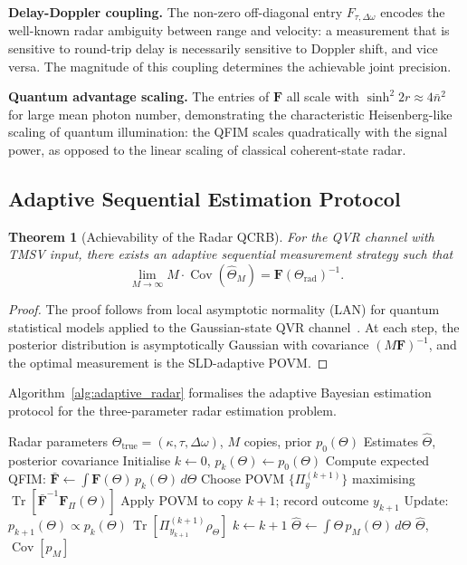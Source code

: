 \documentclass[journal]{IEEEtran}
\newtheorem{theorem}{Theorem}
\DeclareMathOperator{\Tr}{Tr}
\DeclareMathOperator{\Cov}{Cov}
\begin{document}
\textbf{Delay-Doppler coupling.} The non-zero off-diagonal entry $F_{\tau,\Delta\omega}$ encodes the well-known radar ambiguity between range and velocity: a measurement that is sensitive to round-trip delay is necessarily sensitive to Doppler shift, and vice versa. The magnitude of this coupling determines the achievable joint precision.

\textbf{Quantum advantage scaling.} The entries of $\mathbf{F}$ all scale with $\sinh^2 2r \approx 4\bar{n}^2$ for large mean photon number, demonstrating the characteristic Heisenberg-like scaling of quantum illumination: the QFIM scales quadratically with the signal power, as opposed to the linear scaling of classical coherent-state radar.

\subsection{Adaptive Sequential Estimation Protocol}

\begin{theorem}[Achievability of the Radar QCRB]\label{thm:achievability}
For the QVR channel with TMSV input, there exists an adaptive sequential measurement strategy such that
\begin{equation}\label{eq:achievability}
\lim_{M\to\infty} M \cdot \Cov(\hat{\Theta}_M) = \mathbf{F}(\Theta_{\text{rad}})^{-1}.
\end{equation}
\end{theorem}

\begin{proof}
The proof follows from local asymptotic normality (LAN) for quantum statistical models applied to the Gaussian-state QVR channel~\cite{serafini2017quantum}. At each step, the posterior distribution is asymptotically Gaussian with covariance $(M\mathbf{F})^{-1}$, and the optimal measurement is the SLD-adaptive POVM.
\end{proof}

Algorithm~\ref{alg:adaptive_radar} formalises the adaptive Bayesian estimation protocol for the three-parameter radar estimation problem.

\begin{algorithm}[htbp]
\caption{Adaptive Bayesian Radar Parameter Estimation}\label{alg:adaptive_radar}
\begin{algorithmic}[1]
\Require Radar parameters $\Theta_{\text{true}} = (\kappa, \tau, \Delta\omega)$, $M$ copies, prior $p_0(\Theta)$
\Ensure Estimates $\hat{\Theta}$, posterior covariance
\State Initialise $k \gets 0$, $p_k(\Theta) \gets p_0(\Theta)$
    \State Compute expected QFIM: $\bar{\mathbf{F}} \gets \int \mathbf{F}(\Theta)\, p_k(\Theta)\, d\Theta$
    \State Choose POVM $\{\Pi_{y}^{(k+1)}\}$ maximising $\Tr[\bar{\mathbf{F}}^{-1}\mathbf{F}_{\Pi}(\Theta)]$
    \State Apply POVM to copy $k+1$; record outcome $y_{k+1}$
    \State Update: $p_{k+1}(\Theta) \propto p_k(\Theta)\, \Tr[\Pi_{y_{k+1}}^{(k+1)}\rho_{\Theta}]$
    \State $k \gets k + 1$
\EndWhile
\State $\hat{\Theta} \gets \int \Theta\, p_M(\Theta)\, d\Theta$
\State \Return $\hat{\Theta}$, $\Cov[p_M]$
\end{algorithmic}
\end{algorithm}
\end{document}
